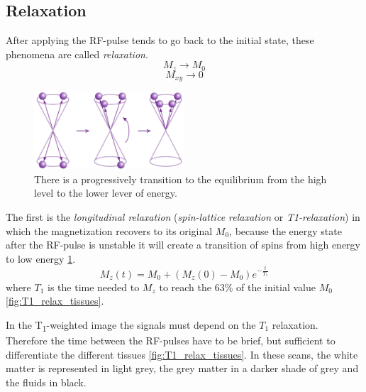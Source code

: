  \subsection{Relaxation}
 After applying the RF-pulse tends to go back to the initial state, these phenomena are called \emph{relaxation}. 
 \[M_{z} \rightarrow M_{0}\]
 \[M_{xy} \rightarrow 0 \]

 \begin{figure}[h]
   \centering
   \includegraphics[width=0.5\textwidth]{images/t1_relax_energy.png}
   \caption{There is a progressively transition to the equilibrium from the high level to the lower lever of energy. \cite{KastlerVetterIRM}}
   \label{fig:T1_relax_energy}
 \end{figure}

 The first is the \emph{longitudinal relaxation} (\emph{spin-lattice relaxation} or \emph{T1-relaxation}) in which the magnetization recovers to its original $M_0$, because the energy state after the RF-pulse is unstable it will create a transition of spins from high energy to low energy \ref{fig:T1_relax_energy}.
 \begin{equation}
    M_{z}(t)=M_{0}+(M_{z}(0)-M_{0})e^{-\frac{t}{T_{1}}}
 \end{equation}
 where $T_1$ is the time needed to $M_{z}$ to reach the $63\%$ of the initial value $M_{0}$ \ref{fig:T1_relax_tissues}.
 
 In the T\textsubscript{1}-weighted image the signals must depend on the $T_1$ relaxation. Therefore the time between the RF-pulses have to be brief, but sufficient to differentiate the different tissues \ref{fig:T1_relax_tissues}. In these scans, the white matter is represented in light grey, the grey matter in a darker shade of grey and the fluids in black.

